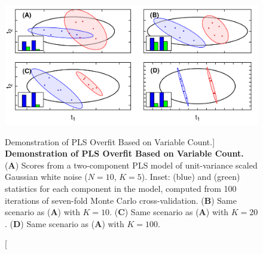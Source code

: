\begin{figure}[ht!]
\includegraphics[width=6.5in]{figs/mva/15.png}
\caption
      [Demonstration of PLS Overfit Based on Variable Count.]{
  {\bf Demonstration of PLS Overfit Based on Variable Count.}
  \\
  ({\bf A}) Scores from a two-component PLS model of unit-variance scaled
  Gaussian white noise ($N = 10$, $K = 5$). Inset: \rsqy{} (blue) and \qsq{}
  (green) statistics for each component in the model, computed from 100
  iterations of seven-fold Monte Carlo cross-validation.
  ({\bf B}) Same scenario as ({\bf A}) with $K = 10$.
  ({\bf C}) Same scenario as ({\bf A}) with $K = 20$.
  ({\bf D}) Same scenario as ({\bf A}) with $K = 100$.
}
\end{figure}


